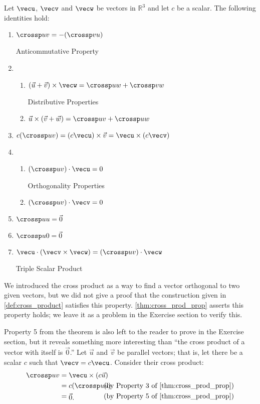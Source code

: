 \setboxwidth{15pt}
{Let $\vecu$, $\vecv$ and $\vecw$ be vectors in $\mathbb{R}^3$ and let $c$ be a scalar. The following identities hold:
\begin{enumerate}
	\item \parbox{167pt}{$\crossp uv = -(\crossp vu)$} Anticommutative Property
	\item	\begin{enumerate}
		\item \parbox{145pt}{$(\vec u+\vec v)\times \vecw = \crossp uw+\crossp vw$} Distributive Properties
		\item	$\vec u \times (\vec v+\vec w) = \crossp uv+\crossp uw$
	\end{enumerate}
	\item		$c(\crossp uv) = (c\vecu) \times \vec v = \vecu \times (c\vecv)$
	\item		\begin{enumerate}
		\item \parbox{145pt}{$(\crossp uv)\cdot \vecu = 0$} Orthogonality Properties
		\item	$(\crossp uv)\cdot \vecv = 0$
	\end{enumerate}
	\item		$\crossp uu = \vec 0$
	\item		$\crossp u0 = \vec 0$
	\item		\parbox{167pt}{$\vecu \cdot (\vecv\times\vecw) = (\crossp uv)\cdot \vecw$} Triple Scalar Product
\end{enumerate}}

We introduced the cross product as a way to find a vector orthogonal to two given vectors, but we did not give a proof that the construction given in \autoref{def:cross_product} satisfies this property. \autoref{thm:cross_prod_prop} asserts this property holds; we leave it as a problem in the Exercise section to verify this.

Property 5 from the theorem is also left to the reader to prove in the Exercise section, but it reveals something more interesting than ``the cross product of a vector with itself is $\vec 0$.'' Let $\vec u$ and $\vec v$ be parallel vectors; that is, let there be a scalar $c$ such that $\vecv = c\vecu$. Consider their cross product:
\begin{align*}
\crossp uv &= \vecu \times (c\vec u) \\
					&=	\parbox{50pt}{$c(\crossp uu)$}\text{(by Property 3 of \autoref{thm:cross_prod_prop})}\\
					&= \parbox{50pt}{$\vec 0$.}\text{(by Property 5 of \autoref{thm:cross_prod_prop})}
\end{align*}

